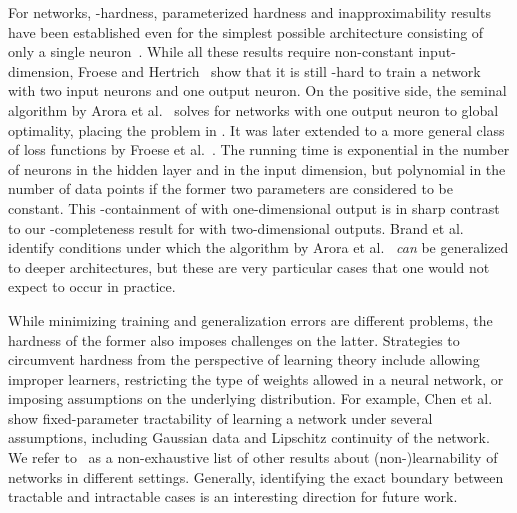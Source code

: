 \documentclass{toc}
\begin{document}
For \ReLU networks, \NP-hardness, parameterized hardness and inapproximability results have been established even for the simplest possible architecture consisting of only a single \ReLU neuron~\cite{Boob2022_Complexity, Dey2020_Approximation, Froese2022_Parameterized, Goel2021_Hardness}.  %
While all these results require non-constant input-dimension, Froese and Hertrich~\cite{Froese2023_FixedDimension} show that it is still \NP-hard to train a \twolayer \ReLU network with two input neurons and one output neuron.
On the positive side, the seminal algorithm by Arora et al.~\cite{Arora2018_Understanding} solves \ERM for \twolayer \ReLU networks with one output neuron to global optimality, placing the problem in \NP.
It was later extended to a more general class of loss functions by Froese et al.~\cite{Froese2022_Parameterized}.
The running time is exponential in the number of neurons in the hidden layer and in the input dimension, but polynomial in the number of data points if the former two parameters are considered to be constant.
This \NP-containment of \ERM with one-dimensional output is in sharp contrast to our \ER-completeness result for \trainNN with two-dimensional outputs.
Brand et al.~\cite{brand2023new} identify conditions under which the algorithm by Arora et al.~\cite{Arora2018_Understanding} \emph{can} be generalized to deeper architectures, but these are very %
particular  %
cases that one would not expect to occur in practice.

While minimizing training and generalization errors are different problems, the hardness of the former also imposes challenges on the latter.
Strategies to circumvent hardness from the perspective of learning theory include allowing improper learners, restricting the type of weights allowed in a neural network, or imposing assumptions on the underlying distribution.
For example, Chen et al.~\cite{Chen2022_LearningFTP} show fixed-parameter tractability of learning a \ReLU network under several assumptions, including Gaussian data and Lipschitz continuity of the network.
We refer to~\cite{Bakshi2019_Learning, Chen2022_Hardness, Diakonikolas2020_Approximation, Goel2017_ReliablyLearning, Goel2019_Learning, Goel2018_Learning}
%
as a non-exhaustive list of other results about (non-)learnability of \ReLU networks in different settings. Generally, identifying the exact boundary between tractable and intractable cases is an interesting direction for future work.
\end{document}

